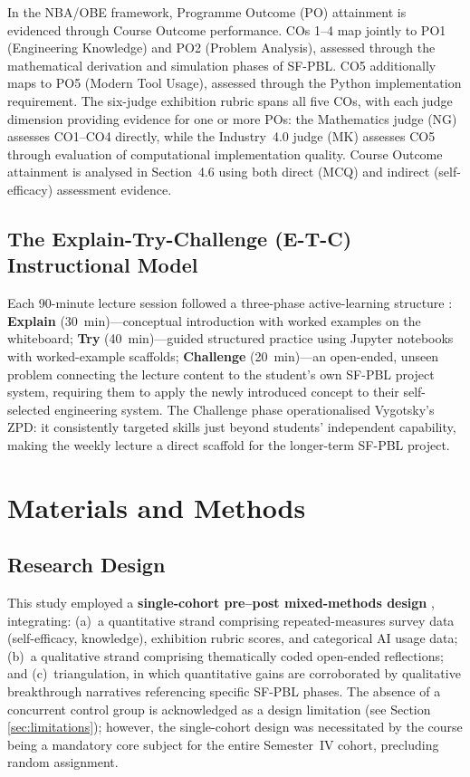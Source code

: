 \documentclass[utf8]{FrontiersinHarvard}
\begin{document}
In the NBA/OBE framework, Programme Outcome (PO) attainment is evidenced
through Course Outcome performance. COs 1--4 map jointly to PO1 (Engineering
Knowledge) and PO2 (Problem Analysis), assessed through the mathematical
derivation and simulation phases of SF-PBL. CO5 additionally maps to PO5
(Modern Tool Usage), assessed through the Python implementation requirement.
The six-judge exhibition rubric spans all five COs, with each judge
dimension providing evidence for one or more POs: the Mathematics judge
(NG) assesses CO1--CO4 directly, while the Industry~4.0 judge (MK) assesses
CO5 through evaluation of computational implementation quality. Course
Outcome attainment is analysed in Section~4.6 using both direct (MCQ) and
indirect (self-efficacy) assessment evidence.

\subsection{The Explain-Try-Challenge (E-T-C) Instructional Model}
\label{sec:etc}

Each 90-minute lecture session followed a three-phase active-learning
structure \citep{prince2006inductive}: \textbf{Explain} (30~min)---conceptual
introduction with worked examples on the whiteboard; \textbf{Try}
(40~min)---guided structured practice using Jupyter notebooks with worked-example
scaffolds; \textbf{Challenge} (20~min)---an open-ended, unseen problem
connecting the lecture content to the student's own SF-PBL project system,
requiring them to apply the newly introduced concept to their self-selected
engineering system. The Challenge phase operationalised Vygotsky's ZPD:
it consistently targeted skills just beyond students' independent capability,
making the weekly lecture a direct scaffold for the longer-term SF-PBL project.

\section{Materials and Methods}

\subsection{Research Design}

This study employed a \textbf{single-cohort pre--post mixed-methods design}
\citep{creswell2018designing}, integrating: (a)~a quantitative strand
comprising repeated-measures survey data (self-efficacy, knowledge),
exhibition rubric scores, and categorical AI usage data; (b)~a qualitative
strand comprising thematically coded open-ended reflections; and
(c)~triangulation, in which quantitative gains are corroborated by
qualitative breakthrough narratives referencing specific SF-PBL phases.
The absence of a concurrent control group is acknowledged as a design
limitation (see Section \ref{sec:limitations}); however, the single-cohort
design was necessitated by the course being a mandatory core subject for
the entire Semester~IV cohort, precluding random assignment.
\end{document}
